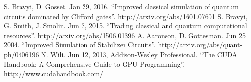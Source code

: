 \documentclass[11pt]{article}
\begin{document}
\begin{thebibliography}{2}
     S. Bravyi, D. Gosset. Jan 29, 2016. ``Improved classical simulation of quantum circuits dominated by Clifford gates''. \url{http://arxiv.org/abs/1601.07601}
     S. Bravyi, G. Smith, J. Smolin. Jun 3, 2015. ``Trading classical and quantum computational resources''. \url{http://arxiv.org/abs/1506.01396}
     A. Aaronson, D. Gottesman. Jun 25 2004. ``Improved Simulation of Stabilizer Circuits''. \url{http://arxiv.org/abs/quant-ph/0406196}
     N. Wilt. Jun 12, 2013, Addison-Wesley Professional. ``The CUDA Handbook: A Comprehensive Guide to GPU Programming''. \url{http://www.cudahandbook.com/}
\end{thebibliography}
\end{document}

